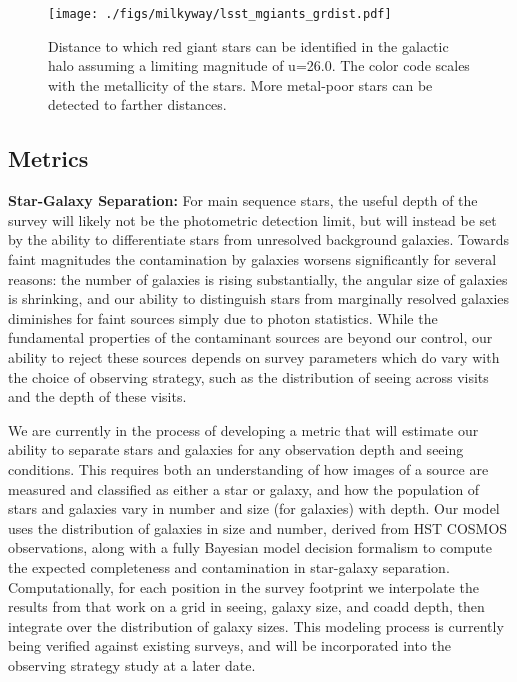 \begin{figure}[h]
\begin{center}
  \texttt{[image: ./figs/milkyway/lsst\_mgiants\_grdist.pdf]}
  \caption{Distance to which red giant stars can be identified in the galactic halo assuming a limiting magnitude
  of u=26.0. The color code scales with the metallicity of the stars. More metal-poor stars can be
  detected to farther distances. \label{fig-MW-giants}}
\end{center}
\end{figure}



\subsection{Metrics}
\label{sec:\secname:MW_Halo_metrics}

\textbf{Star-Galaxy Separation:} For main sequence stars, the useful depth of
the survey will likely not be the photometric detection limit, but will instead
be set by the ability to differentiate stars from unresolved background
galaxies. Towards faint magnitudes the contamination by galaxies worsens
significantly for several reasons: the number of galaxies is rising
substantially, the angular size of galaxies is shrinking, and our ability to
distinguish stars from marginally resolved galaxies diminishes for faint
sources simply due to photon statistics. While the fundamental properties of
the contaminant sources are beyond our control, our ability to reject these
sources depends on survey parameters which do vary with the choice of observing strategy, such as the distribution of seeing across
visits and the depth of these visits.

We are currently in the process of developing a metric that will estimate our
ability to separate stars and galaxies for any observation depth and seeing
conditions. This requires both an understanding of how images of a source are
measured and classified as either a star or galaxy, and how the population of
stars and galaxies vary in number and size (for galaxies) with depth. Our model
uses the distribution of galaxies in size and number, derived from HST COSMOS
observations, along with a fully Bayesian model decision formalism to compute
the expected completeness and contamination in star-galaxy separation.
Computationally, for each position in the survey footprint we interpolate the
results from that work on a grid in seeing, galaxy size, and coadd depth, then
integrate over the distribution of galaxy sizes. This modeling process is
currently being verified against existing surveys, and will be incorporated into
the observing strategy study at a later date.

